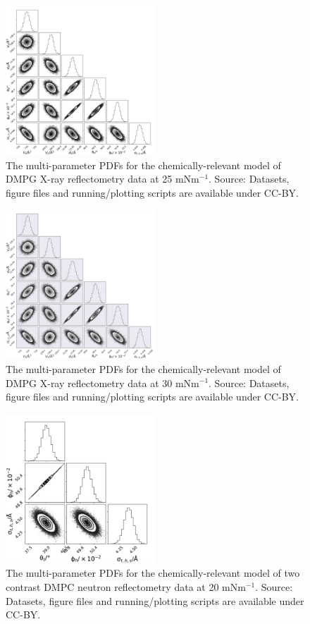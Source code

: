 \documentclass[11pt,a4paper]{article}
\begin{document}
\begin{figure}[h]
	\centering
	\includegraphics[width=0.50\textwidth]{figures/dmpg4_all_corner}
	\caption{The multi-parameter PDFs for the chemically-relevant model of DMPG X-ray reflectometry data at 25 mNm$^{-1}$. Source: Datasets, figure files and running/plotting scripts are available under CC-BY.\cite{mccluskey_2018}}
	\label{fig:dmpg4}
\end{figure}
\begin{figure}
	\centering
	\includegraphics[width=0.50\textwidth]{figures/dmpg5_all_corner}
	\caption{The multi-parameter PDFs for the chemically-relevant model of DMPG X-ray reflectometry data at 30 mNm$^{-1}$. Source: Datasets, figure files and running/plotting scripts are available under CC-BY.\cite{mccluskey_2018}}
	\label{fig:dmpg5}
\end{figure}
\begin{figure}[h]
	\centering
	\includegraphics[width=0.50\textwidth]{figures/dmpc_20n_all_corner}
	\caption{The multi-parameter PDFs for the chemically-relevant model of two contrast DMPC neutron reflectometry data at 20 mNm$^{-1}$. Source: Datasets, figure files and running/plotting scripts are available under CC-BY.\cite{mccluskey_2018}}
	\label{fig:dmpcn1}
\end{figure}
\end{document}
